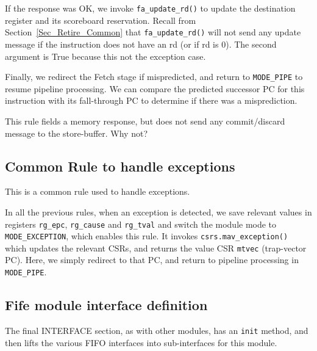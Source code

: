 If the response was OK, we invoke \verb|fa_update_rd()| to update the
destination register and its scoreboard reservation.  Recall from
Section~\ref{Sec_Retire_Common} that \verb|fa_update_rd()| will not
send any update message if the instruction does not have an rd (or if
rd is 0).  The second argument is True because this not the exception
case.

Finally, we redirect the Fetch stage if mispredicted, and return to
\verb|MODE_PIPE| to resume pipeline processing.  We can compare the
predicted successor PC for this instruction with its fall-through PC
to determine if there was a misprediction.


\Exercise

This rule fields a memory response, but does not send any
commit/discard message to the store-buffer.  Why not?

\Endexercise


\subsection{Common Rule to handle exceptions}

\label{Sec_Fife_Exception}

This is a common rule used to handle exceptions.



In all the previous rules, when an exception is detected, we save
relevant values in registers \verb|rg_epc|, \verb|rg_cause| and
\verb|rg_tval| and switch the module mode to \verb|MODE_EXCEPTION|,
which enables this rule.  It invokes \verb|csrs.mav_exception()| which
updates the relevant CSRs, and returns the value CSR \verb|mtvec|
(trap-vector PC).  Here, we simply redirect to that PC, and return to
pipeline processing in \verb|MODE_PIPE|.


\subsection{Fife module interface definition}

The final INTERFACE section, as with other modules, has an \verb|init|
method, and then lifts the various FIFO interfaces into sub-interfaces
for this module.

